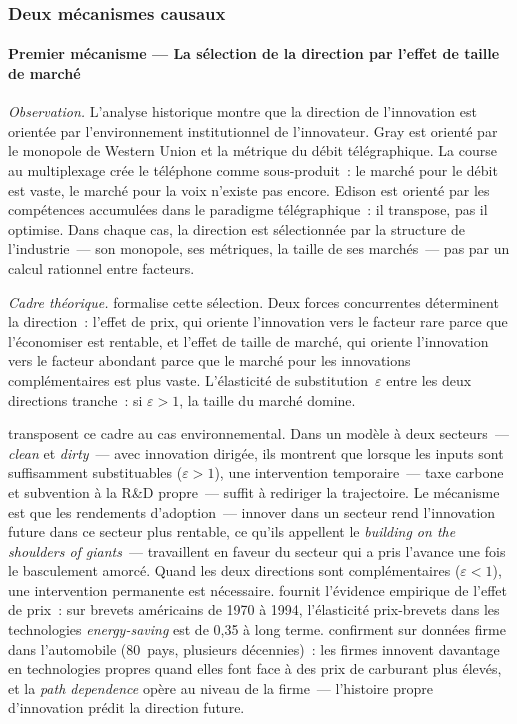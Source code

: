 \subsubsection{Deux mécanismes causaux}


\paragraph{Premier mécanisme --- La sélection de la direction par l'effet de taille de marché}

\markNEO

\emph{Observation.} L'analyse historique montre que la direction de l'innovation est orientée par l'environnement institutionnel de l'innovateur. Gray est orienté par le monopole de Western Union et la métrique du débit télégraphique. La course au multiplexage crée le téléphone comme sous-produit~: le marché pour le débit est vaste, le marché pour la voix n'existe pas encore. Edison est orienté par les compétences accumulées dans le paradigme télégraphique~: il transpose, pas il optimise. Dans chaque cas, la direction est sélectionnée par la structure de l'industrie~--- son monopole, ses métriques, la taille de ses marchés~--- pas par un calcul rationnel entre facteurs.

\emph{Cadre théorique.} \textcite{acemoglu_directed_2002} formalise cette sélection. Deux forces concurrentes déterminent la direction~: l'effet de prix, qui oriente l'innovation vers le facteur rare parce que l'économiser est rentable, et l'effet de taille de marché, qui oriente l'innovation vers le facteur abondant parce que le marché pour les innovations complémentaires est plus vaste. L'élasticité de substitution~$\varepsilon$ entre les deux directions tranche~: si $\varepsilon > 1$, la taille du marché domine.

\textcite{acemoglu_environment_2012} transposent ce cadre au cas environnemental. Dans un modèle à deux secteurs~--- \emph{clean} et \emph{dirty}~--- avec innovation dirigée, ils montrent que lorsque les inputs sont suffisamment substituables ($\varepsilon > 1$), une intervention temporaire~--- taxe carbone et subvention à la R\&D propre~--- suffit à rediriger la trajectoire. Le mécanisme est que les rendements d'adoption~--- innover dans un secteur rend l'innovation future dans ce secteur plus rentable, ce qu'ils appellent le \og \emph{building on the shoulders of giants}\fg{}~--- travaillent en faveur du secteur qui a pris l'avance une fois le basculement amorcé. Quand les deux directions sont complémentaires ($\varepsilon < 1$), une intervention permanente est nécessaire. \textcite{popp_induced_2002} fournit l'évidence empirique de l'effet de prix~: sur brevets américains de 1970 à 1994, l'élasticité prix-brevets dans les technologies \emph{energy-saving} est de 0,35 à long terme. \textcite{aghion_carbon_2016} confirment sur données firme dans l'automobile (80~pays, plusieurs décennies)~: les firmes innovent davantage en technologies propres quand elles font face à des prix de carburant plus élevés, et la \emph{path dependence} opère au niveau de la firme~--- l'histoire propre d'innovation prédit la direction future.


